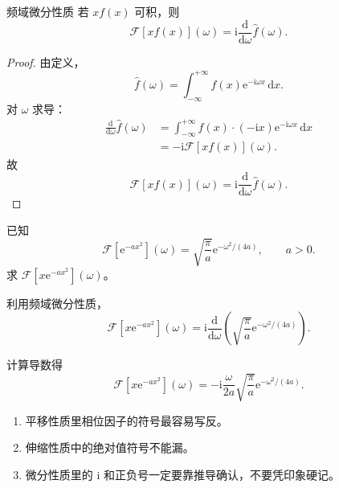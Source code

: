 \begin{dingli}{频域微分性质}{}
若 $xf(x)$ 可积，则
\begin{equation}
    \mathcal{F}[xf(x)](\omega)=\mathrm{i}\frac{\mathrm{d}}{\mathrm{d}\omega}\hat{f}(\omega).
\end{equation}
\end{dingli}

\begin{proof}
由定义，
\begin{equation}
    \hat{f}(\omega)
    =
    \int_{-\infty}^{+\infty}
    f(x)\mathrm{e}^{-\mathrm{i}\omega x}\,\mathrm{d}x.
\end{equation}
对 $\omega$ 求导：
\begin{align}
    \frac{\mathrm{d}}{\mathrm{d}\omega}\hat{f}(\omega)
    &=
    \int_{-\infty}^{+\infty}
    f(x)\cdot(-\mathrm{i}x)\mathrm{e}^{-\mathrm{i}\omega x}\,\mathrm{d}x \\
    &=
    -\mathrm{i}\mathcal{F}[xf(x)](\omega).
\end{align}
故
\begin{equation}
    \mathcal{F}[xf(x)](\omega)=\mathrm{i}\frac{\mathrm{d}}{\mathrm{d}\omega}\hat{f}(\omega).
\end{equation}
\end{proof}

\begin{lizi}{}{}
已知
\begin{equation}
    \mathcal{F}[\mathrm{e}^{-ax^2}](\omega)=\sqrt{\frac{\pi}{a}}\mathrm{e}^{-\omega^2/(4a)},
    \qquad a>0.
\end{equation}
求 $\mathcal{F}[x\mathrm{e}^{-ax^2}](\omega)$。

\begin{jie}
利用频域微分性质，
\begin{equation}
    \mathcal{F}[x\mathrm{e}^{-ax^2}](\omega)
    =
    \mathrm{i}\frac{\mathrm{d}}{\mathrm{d}\omega}
    \left(
        \sqrt{\frac{\pi}{a}}\mathrm{e}^{-\omega^2/(4a)}
    \right).
\end{equation}

计算导数得
\begin{equation}
    \mathcal{F}[x\mathrm{e}^{-ax^2}](\omega)
    =
    -\mathrm{i}\frac{\omega}{2a}\sqrt{\frac{\pi}{a}}\mathrm{e}^{-\omega^2/(4a)}.
\end{equation}
\end{jie}
\end{lizi}

\begin{jinshi}[做这类题时最容易错在哪里]
\begin{enumerate}
    \item 平移性质里相位因子的符号最容易写反。
    \item 伸缩性质中的绝对值符号不能漏。
    \item 微分性质里的 $\mathrm{i}$ 和正负号一定要靠推导确认，不要凭印象硬记。
\end{enumerate}
\end{jinshi}

